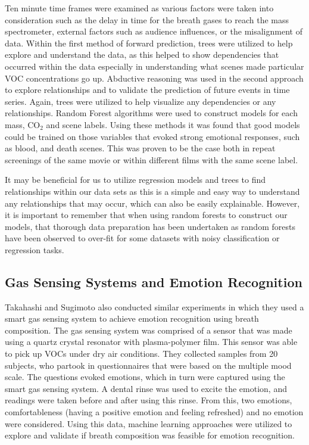 \documentclass[letterpaper, 10 pt, conference]{ieeeconf}  %
\begin{document}
Ten minute time frames were examined as various factors were taken into consideration such as the delay in time for the breath gases to reach the mass spectrometer, external factors such as audience influences, or the misalignment of data. Within the first method of forward prediction, trees were utilized to help explore and understand the data, as this helped to show dependencies that occurred within the data especially in understanding what scenes made particular VOC concentrations go up. Abductive reasoning was used in the second approach to explore relationships and to validate the prediction of future events in time series. Again, trees were utilized to help visualize any dependencies or any relationships. Random Forest algorithms were used to construct models for each mass, CO$_2$ and scene labels. Using these methods it was found that good models could be trained on those variables that evoked strong emotional responses, such as blood, and death scenes.  This was proven to be the case both in repeat screenings of the same movie or within different films with the same scene label. 

It may be beneficial for us to utilize regression models and trees to find relationships within our data sets as this is a simple and easy way to understand any relationships that may occur, which can also be easily explainable. However, it is important to remember that when using random forests to construct our models, that thorough data preparation has been undertaken as random forests have been observed to over-fit for some datasets with noisy classification or regression tasks.  

\subsection{Gas Sensing Systems and Emotion Recognition}
Takahashi and Sugimoto \cite{4601732} also conducted similar experiments in which they used a smart gas sensing system to achieve emotion recognition using breath composition.  The gas sensing system was comprised of a sensor that was made using a quartz crystal resonator with plasma-polymer film. This sensor was able to pick up VOCs under dry air conditions. They collected samples from 20 subjects, who partook in questionnaires that were based on the multiple mood scale. The questions evoked emotions, which in turn were captured using the smart gas sensing system. A dental rinse was used to excite the emotion, and readings were taken before and after using this rinse.  From this, two emotions, comfortableness (having a positive emotion and feeling refreshed) and no emotion were considered. Using this data, machine learning approaches were utilized to explore and validate if breath composition was feasible for emotion recognition.
\end{document}
